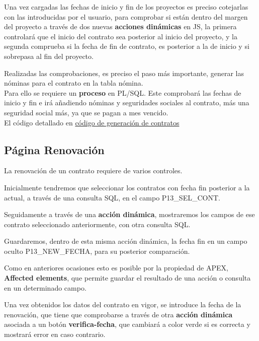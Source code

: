 Una vez cargadas las fechas de inicio y fin de los proyectos es preciso cotejarlas con las introducidas por el usuario, para comprobar si están dentro del margen del proyecto a través de dos nuevas  \textbf{acciones dinámicas} en \acrshort{JS}, la primera controlará que el inicio del contrato sea posterior al inicio del proyecto, y la segunda comprueba si la fecha de fin de contrato, es posterior a la de inicio y si sobrepasa al fin del proyecto.

Realizadas las comprobaciones, es preciso el paso más importante, generar las nóminas para el contrato en la tabla nómina.\\

Para ello se requiere un \textbf{proceso} en \acrshort{PL/SQL}. Este comprobará las fechas de inicio y fin e irá añadiendo nóminas y seguridades sociales al contrato, más una seguridad social más, ya que se pagan a mes vencido.\\
El código detallado en \href{https://github.com/far0010/TFGUBU-Fran_Arroyo/project-docs/memoria/sql
	/consultas_contratos.sql}{código de generación de contratos}
\subsection{Página Renovación}
La renovación de un contrato requiere de varios controles. 

Inicialmente tendremos que seleccionar los contratos con fecha fin posterior a la actual, a través de una consulta \acrshort{SQL}, en el campo P13\_SEL\_CONT.

Seguidamente a través de una \textbf{acción dinámica}, mostraremos los campos de ese contrato seleccionado anteriormente, con otra consulta \acrshort{SQL}.

Guardaremos, dentro de esta misma acción dinámica, la fecha fin en un campo oculto P13\_NEW\_FECHA, para su posterior comparación. 

Como en anteriores ocasiones esto es posible por la propiedad de \acrshort{APEX},\textbf{ Affected elements}, que permite guardar el resultado de una acción o consulta en un determinado campo.

Una vez obtenidos los datos del contrato en vigor, se introduce la fecha de la renovación, que tiene que comprobarse a través de otra \textbf{acción dinámica} asociada a un botón \textbf{verifica-fecha}, que cambiará a color verde si es correcta y mostrará error en caso contrario. 

